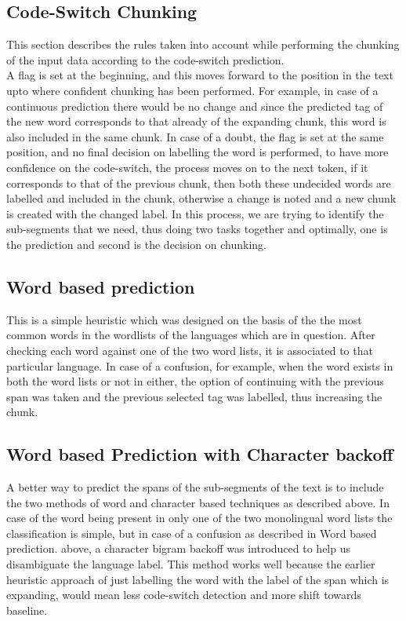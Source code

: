 \documentclass[11pt]{article}
\begin{document}
\subsection{Code-Switch Chunking}
\label{cschunking}

This section describes the rules taken into account while performing the chunking of the input data according to the code-switch prediction. \\

A flag is set at the beginning, and this moves forward to the position in the text upto where confident chunking has been performed. For example, in case of a continuous prediction there would be no change and since the predicted tag of the new word corresponds to that already of the expanding chunk, this word is also included in the same chunk. In case of a doubt, the flag is set at the same position, and no final decision on labelling the word is performed, to have more confidence on the code-switch, the process moves on to the next token, if it corresponds to that of the previous chunk, then both these undecided words are labelled and included in the chunk, otherwise a change is noted and a new chunk is created with the changed label. In this process, we are trying to identify the sub-segments that we need, thus doing two tasks together and optimally, one is the prediction and second is the decision on chunking. \\

\subsection{Word based prediction}
\label{wbased}

 This is a simple heuristic which was designed on the basis of the the most common words in the wordlists of the languages which are in question. After checking each word against one of the two word lists, it is associated to that particular language. In case of a confusion, for example, when the word exists in both the word lists or not in either, the option of continuing with the previous span was taken and the previous selected tag was labelled, thus increasing the chunk. \\

\subsection{Word based Prediction with Character backoff}
\label{wbasedbackoff}

  A better way to predict the spans of the sub-segments of the text is to include the two methods of word and character based techniques as described above. In case of the word being present in only one of the two monolingual word lists the classification is simple, but in case of a confusion as described in Word based prediction. above, a character bigram backoff was introduced to help us disambiguate the language label. This method works well because the earlier heuristic approach of just labelling the word with the label of the span which is expanding, would mean less code-switch detection and more shift towards baseline. \\
\end{document}
